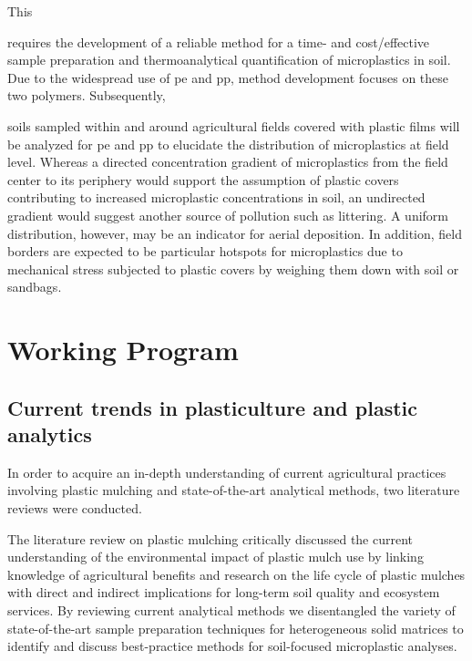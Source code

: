 \documentclass[justified,a4paper,
	nofonts,
	nobib
]{tufte-handout}
\begin{document}
This
\begin{enumerate*}
	\item requires the development of a reliable method for a time- and cost\-/effective sample preparation and thermoanalytical quantification of microplastics in soil. Due to the widespread use of \ac{pe} and \ac{pp}, method development focuses on these two polymers.
	Subsequently, \item soils sampled within and around agricultural fields covered with plastic films will be analyzed for \ac{pe} and \ac{pp} to elucidate the distribution of microplastics at field level. Whereas a directed concentration gradient of microplastics from the field center to its periphery would support the assumption of plastic covers contributing to increased microplastic concentrations in soil, an undirected gradient would suggest another source of pollution such as littering. A uniform distribution, however, may be an indicator for aerial deposition. In addition, field borders are expected to be particular hotspots for microplastics due to mechanical stress subjected to plastic covers by weighing them down with soil or sandbags.
\end{enumerate*}

\section{Working Program}\label{sec:methods}

\subsection{Current trends in plasticulture and plastic analytics}

In order to acquire an in-depth understanding of current agricultural practices involving plastic mulching and state-of-the-art analytical methods, two literature reviews were conducted.

The literature review on plastic mulching critically discussed the current understanding of the environmental impact of plastic
mulch use by linking knowledge of agricultural benefits and research on the life cycle of plastic mulches with direct and indirect implications for long-term soil quality and ecosystem services. By reviewing current analytical methods we disentangled the variety of state-of-the-art
sample preparation techniques for heterogeneous solid matrices to identify and discuss
best-practice methods for soil-focused microplastic analyses.
\end{document}

